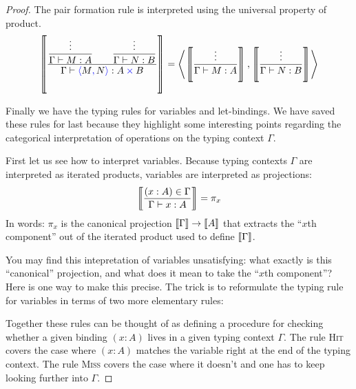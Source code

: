 \begin{proof}
  The pair formation rule is interpreted using the universal property of product.
  \begin{align}
    \llbr{
      \displaystyle\frac
        {\displaystyle\frac{\vdots}{{{{\Gamma \vdash M : A}}}}
          \qquad
         \displaystyle\frac{\vdots}{{{{\Gamma \vdash N : B}}}}
        }
        {\Gamma \vdash \plpair{M}{N} : A \pltimes B}
    }
    = \left\langle
      \llbr{\frac{\vdots}{\Gamma \vdash M: A}}
      ,
      \llbr{\frac{\vdots}{\Gamma \vdash N: B}}
    \right\rangle
  \end{align}

  Finally we have the typing rules for variables and let-bindings.
  We have saved these rules for last because they highlight some
  interesting points regarding the categorical interpretation
  of operations on the typing context \(\Gamma\).

  First let us see how to interpret variables.
  Because typing contexts \(\Gamma\) are interpreted as iterated products,
  variables are interpreted as projections:
  \begin{align}
    \left\llbracket 
      \frac{(x:A)\in\Gamma}{\Gamma \vdash x : A}
    \right\rrbracket
    = \pi_x
  \end{align}
  In words: \(\pi_x\) is the canonical projection
  \(\left\llbracket \Gamma\right\rrbracket \to \left\llbracket A\right\rrbracket\)
  that extracts the
  ``\(x\)th component'' out of
  the iterated product used to define \(\left\llbracket \Gamma\right\rrbracket\).

  You may find this intepretation of variables unsatisfying:
  what exactly is this ``canonical'' projection,
  and what does it mean to take the ``\(x\)th component''?
  Here is one way to make this precise.
  The trick is to reformulate the typing rule for variables
  in terms of two more elementary rules:
  Together these rules can be thought of as defining
  a procedure for checking whether a given binding \((x:A)\)
  lives in a given typing context \(\Gamma\).
  The rule \textsc{Hit} covers the case where \((x:A)\)
  matches the variable right at the end of the typing context.
  The rule \textsc{Miss} covers the case where
  it doesn't and one has to keep looking further into \(\Gamma\).


\end{proof}
